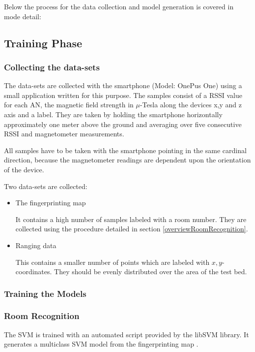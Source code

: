 Below the process for the data collection and model generation is covered in mode detail:

\subsection{Training Phase}
\subsubsection{Collecting the data-sets}

The data-sets are collected with the smartphone (Model: OnePus One) using a small application written for this purpose. The samples consist of a RSSI value for each AN, the magnetic field strength in \(\mu\)-Tesla along the devices x,y and z axis and a label. They are taken by holding the smartphone horizontally approximately one meter above the ground and averaging over five 
consecutive RSSI and magnetometer measurements.

All samples have to be taken with the smartphone pointing in the same cardinal direction, because the magnetometer readings are dependent upon the orientation of the device.


Two data-sets are collected:

\begin{itemize}
\item The fingerprinting map

It contains a high number of samples labeled with a room number. They are collected using the procedure detailed in section \ref{overviewRoomRecognition}.

\item Ranging data

This contains a smaller number of points which are labeled with \(x,y\)-coordinates. They should be evenly distributed over the area of the test bed.
\end{itemize}

\subsubsection{Training the Models}

\subsubsection{Room Recognition}
The SVM is trained with an automated script provided by the libSVM library. It generates a multiclass SVM model from the fingerprinting map .

